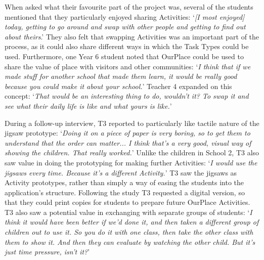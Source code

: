 When asked what their favourite part of the project was, several of the students mentioned that they particularly enjoyed sharing Activities: `\textit{[I most enjoyed] today, getting to go around and swap with other people and getting to find out about theirs}.' They also felt that swapping Activities was an important part of the process, as it could also share different ways in which the Task Types could be used. Furthermore, one Year 6 student noted that OurPlace could be used to share the value of place with visitors and other communities: `\textit{I think that if we made stuff for another school that made them learn, it would be really good because you could make it about your school.}' Teacher 4 expanded on this concept: `\textit{That would be an interesting thing to do, wouldn't it? To swap it and see what their daily life is like and what yours is like.}' 

During a follow-up interview, T3 reported to particularly like tactile nature of the jigsaw prototype: `\textit{Doing it on a piece of paper is very boring, so to get them to understand that the order can matter... I think that's a very good, visual way of showing the children. That really worked.}' Unlike the children in School 2, T3 also saw value in doing the prototyping for making further Activities: `\textit{I would use the jigsaws every time. Because it's a different Activity.}' T3 saw the jigsaws as Activity prototypes, rather than simply a way of easing the students into the application's structure. Following the study T3 requested a digital version, so that they could print copies for students to prepare future OurPlace Activities. T3 also saw a potential value in exchanging with separate groups of students: `\textit{I think it would have been better if we'd done it, and then taken a different group of children out to use it. So you do it with one class, then take the other class with them to show it. And then they can evaluate by watching the other child. But it's just time pressure, isn't it?}'


